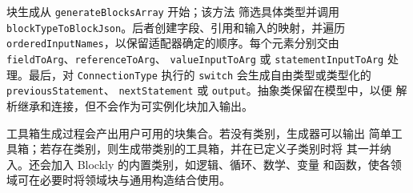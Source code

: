 块生成从 \texttt{generateBlocks}\allowbreak\texttt{Array} 开始；该方法
筛选具体类型并调用
\texttt{blockTypeTo}\allowbreak\texttt{BlockJson}。后者创建字段、引用和输入的映射，并遍历
\texttt{orderedInput}\allowbreak\texttt{Names}，以保留适配器确定的顺序。每个元素分别交由
\texttt{fieldToArg}、\texttt{referenceToArg}、
\texttt{valueInputToArg} 或
\texttt{statementInput}\allowbreak\texttt{ToArg} 处理。最后，对
\texttt{Connection}\allowbreak\texttt{Type} 执行的
\texttt{switch} 会生成自由类型或类型化的
\texttt{previous}\allowbreak\texttt{Statement}、
\texttt{nextStatement} 或 \texttt{output}。抽象类保留在模型中，以便
解析继承和连接，但不会作为可实例化块加入输出。

工具箱生成过程会产出用户可用的块集合。若没有类别，生成器可以输出
简单工具箱；若存在类别，则生成带类别的工具箱，并在已定义子类别时将
其一并纳入。还会加入 Blockly 的内置类别，如逻辑、循环、数学、变量
和函数，使各领域可在必要时将领域块与通用构造结合使用。
